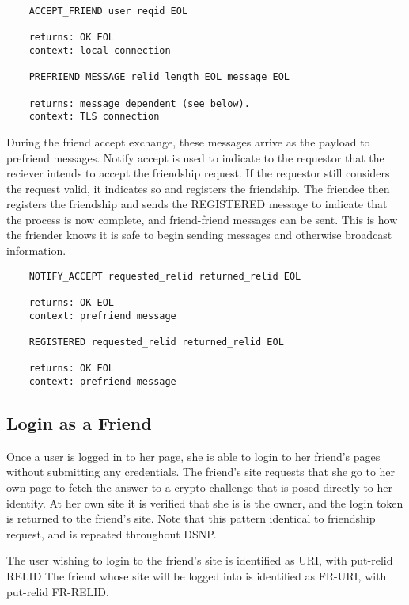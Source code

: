 \documentclass[letterpaper,11pt,oneside]{article}
\begin{document}
\vspace{10pt}
\begin{verbatim}
    ACCEPT_FRIEND user reqid EOL

    returns: OK EOL
    context: local connection

    PREFRIEND_MESSAGE relid length EOL message EOL

    returns: message dependent (see below).
    context: TLS connection
\end{verbatim}
\vspace{10pt}

During the friend accept exchange, these messages arrive as the payload to
prefriend messages. Notify accept is used to indicate to the requestor that the
reciever intends to accept the friendship request. If the requestor still
considers the request valid, it indicates so and registers the friendship. The
friendee then registers the friendship and sends the REGISTERED message to
indicate that the process is now complete, and friend-friend messages can be
sent. This is how the friender knows it is safe to begin sending messages and
otherwise broadcast information.

\vspace{10pt}
\begin{verbatim}
    NOTIFY_ACCEPT requested_relid returned_relid EOL

    returns: OK EOL
    context: prefriend message

    REGISTERED requested_relid returned_relid EOL

    returns: OK EOL
    context: prefriend message
\end{verbatim}

\subsection{Login as a Friend}

Once a user is logged in to her page, she is able to login to her friend's
pages without submitting any credentials. The friend's site requests that she
go to her own page to fetch the answer to a crypto challenge that is posed
directly to her identity. At her own site it is verified that she is is the
owner, and the login token is returned to the friend's site. Note that this
pattern identical to friendship request, and is repeated throughout DSNP.

The user wishing to login to the friend's site is identified as URI, with
put-relid RELID The friend whose site will be logged into is identified as
FR-URI, with put-relid FR-RELID.
\end{document}
